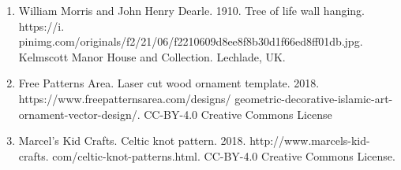 \begin{enumerate}
    \item {William Morris and John Henry Dearle. 1910. Tree of life wall hanging.  https://i. pinimg.com/originals/f2/21/06/f2210609d8ee8f8b30d1f66ed8ff01db.jpg. Kelmscott Manor House and Collection. Lechlade, UK.}
    
    \item{Free Patterns Area. Laser cut wood ornament template. 2018. https://www.freepatternsarea.com/designs/ geometric-decorative-islamic-art-ornament-vector-design/. CC-BY-4.0 Creative Commons License}
    \item {Marcel's Kid Crafts. Celtic knot pattern. 2018. http://www.marcels-kid-crafts. com/celtic-knot-patterns.html. CC-BY-4.0 Creative Commons License.}
\end{enumerate}

% 
